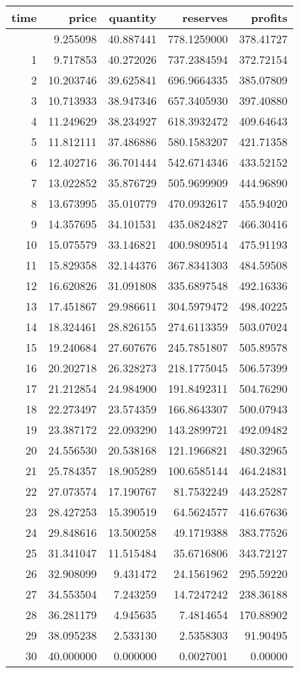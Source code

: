 \documentclass[
]{article}
\begin{document}
\begin{longtable}[]{@{}rrrrr@{}}
\toprule\noalign{}
time & price & quantity & reserves & profits \\
\midrule\noalign{}
\endhead
\bottomrule\noalign{}
\endlastfoot
0 & 9.255098 & 40.887441 & 778.1259000 & 378.41727 \\
1 & 9.717853 & 40.272026 & 737.2384594 & 372.72154 \\
2 & 10.203746 & 39.625841 & 696.9664335 & 385.07809 \\
3 & 10.713933 & 38.947346 & 657.3405930 & 397.40880 \\
4 & 11.249629 & 38.234927 & 618.3932472 & 409.64643 \\
5 & 11.812111 & 37.486886 & 580.1583207 & 421.71358 \\
6 & 12.402716 & 36.701444 & 542.6714346 & 433.52152 \\
7 & 13.022852 & 35.876729 & 505.9699909 & 444.96890 \\
8 & 13.673995 & 35.010779 & 470.0932617 & 455.94020 \\
9 & 14.357695 & 34.101531 & 435.0824827 & 466.30416 \\
10 & 15.075579 & 33.146821 & 400.9809514 & 475.91193 \\
11 & 15.829358 & 32.144376 & 367.8341303 & 484.59508 \\
12 & 16.620826 & 31.091808 & 335.6897548 & 492.16336 \\
13 & 17.451867 & 29.986611 & 304.5979472 & 498.40225 \\
14 & 18.324461 & 28.826155 & 274.6113359 & 503.07024 \\
15 & 19.240684 & 27.607676 & 245.7851807 & 505.89578 \\
16 & 20.202718 & 26.328273 & 218.1775045 & 506.57399 \\
17 & 21.212854 & 24.984900 & 191.8492311 & 504.76290 \\
18 & 22.273497 & 23.574359 & 166.8643307 & 500.07943 \\
19 & 23.387172 & 22.093290 & 143.2899721 & 492.09482 \\
20 & 24.556530 & 20.538168 & 121.1966821 & 480.32965 \\
21 & 25.784357 & 18.905289 & 100.6585144 & 464.24831 \\
22 & 27.073574 & 17.190767 & 81.7532249 & 443.25287 \\
23 & 28.427253 & 15.390519 & 64.5624577 & 416.67636 \\
24 & 29.848616 & 13.500258 & 49.1719388 & 383.77526 \\
25 & 31.341047 & 11.515484 & 35.6716806 & 343.72127 \\
26 & 32.908099 & 9.431472 & 24.1561962 & 295.59220 \\
27 & 34.553504 & 7.243259 & 14.7247242 & 238.36188 \\
28 & 36.281179 & 4.945635 & 7.4814654 & 170.88902 \\
29 & 38.095238 & 2.533130 & 2.5358303 & 91.90495 \\
30 & 40.000000 & 0.000000 & 0.0027001 & 0.00000 \\
\end{longtable}
\end{document}
